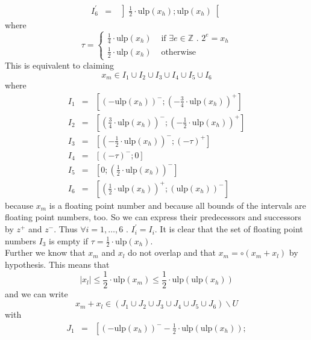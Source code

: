 \documentclass[a4paper,10pt,twoside]{article}
\newenvironment{proof}[1][Proof]{\begin{trivlist}
\item[\hskip \labelsep {\bfseries #1}]}{\end{trivlist}}
\newcommand{\Z}{\ensuremath{\mathbb {Z}}}
\newcommand{\hi}{\ensuremath{\mathit{h}}}
\newcommand{\mi}{\ensuremath{\mathit{m}}}
\newcommand{\lo}{\ensuremath{\mathit{l}}}
\newcommand{\mUlp}{\ensuremath{\mathrm{ulp}}}
\begin{document}
\begin{proof}
\begin{eqnarray*}
I^\prime_6 & = & \left ] \frac{1}{2} \cdot \mUlp\left( x_\hi \right) ; \mUlp\left( x_\hi \right) \right [
\end{eqnarray*}
where
$$\tau = \left \lbrace 
\begin{array}{ll} \frac{1}{4} \cdot \mUlp \left( x_\hi \right) & \mbox{ if } \exists e \in \Z \mbox{ . } 2^e = x_\hi \\
                  \frac{1}{2} \cdot \mUlp \left( x_\hi \right) & \mbox{ otherwise} \end{array} \right.$$
This is equivalent to claiming
$$x_\mi \in I_1 \cup I_2 \cup I_3 \cup I_4 \cup I_5 \cup I_6$$
where
\begin{eqnarray*}
I_1 & = & \left [ \left( -\mUlp\left( x_\hi \right) \right)^- ; 
\left( -\frac{3}{4} \cdot \mUlp\left(x_\hi \right) \right)^+ \right] \\
I_2 & = & \left [ \left( \frac{3}{4} \cdot \mUlp\left( x_\hi \right) \right)^- ; 
\left(- \frac{1}{2} \cdot \mUlp\left(x_\hi \right)\right)^+ \right] \\
I_3 & = & \left [ \left( -\frac{1}{2} \cdot \mUlp\left( x_\hi \right) \right)^- ; \left( -\tau \right)^+ \right] \\
I_4 & = & \left [ \left( -\tau \right)^- ; 0 \right] \\
I_5 & = & \left [ 0 ; \left( \frac{1}{2} \cdot \mUlp\left(x_\hi\right) \right)^- \right] \\
I_6 & = & \left [ \left(\frac{1}{2} \cdot \mUlp\left( x_\hi \right) \right)^+ ; \left( \mUlp\left( x_\hi \right) \right)^- \right ]
\end{eqnarray*}
because $x_\mi$ is a floating point number and because all bounds of the intervals are floating point numbers, too. So
we can express their predecessors and successors by $z^+$ and $z^-$. Thus $\forall i=1,\dots,6 \mbox{ . } I^\prime_i = I_i$. 
It is clear that the set of floating point numbers $I_3$ is empty if 
$\tau = \frac{1}{2} \cdot \mUlp\left( x_\hi \right)$.\\
Further we know that $x_\mi$ and $x_\lo$ do not overlap and that $x_\mi = \circ \left( x_\mi + x_\lo \right)$ by hypothesis.
This means that 
$$\left \vert x_\lo \right \vert \leq \frac{1}{2} \cdot \mUlp \left( x_\mi \right) \leq \frac{1}{2} \cdot \mUlp\left( \mUlp \left( x_\hi \right) \right)$$
and we can write 
$$x_\mi + x_\lo \in \left( J_1 \cup J_2 \cup J_3 \cup J_4 \cup J_5 \cup J_6\right) \backslash U$$
with
\begin{eqnarray*}
J_1 & = & \left [ \left( -\mUlp\left( x_\hi \right) \right)^- 
- \frac{1}{2} \cdot \mUlp\left( \mUlp \left( x_\hi \right) \right) ; 

\end{eqnarray*}
\end{proof}
\end{document}

